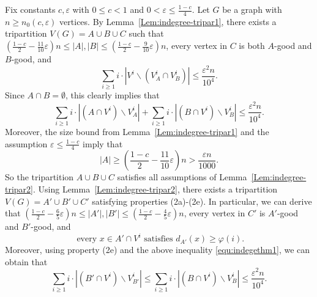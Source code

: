 \documentclass{aic}
\begin{document}
	Fix constants $c, \varepsilon$ with $0\leq c<1$ and $0<\varepsilon\leq \frac{1-c}{4}.$
	Let $G$ be a graph with $n\geq n_0(c,\varepsilon)$ vertices.
	By Lemma~\ref{Lem:indegree-tripar1}, there exists a tripartition $V(G)=A\cup B\cup C$ such that
	$\left(\frac{1-c}{2}-\frac{11}{10}\varepsilon\right)n\leq |A|,|B|\leq \left(\frac{1-c}{2}-\frac{9}{10}\varepsilon\right)n$,
	every vertex in $C$ is both $A$-good and $B$-good, and
	\begin{equation*}
		\sum_{i\ge 1} i\cdot |V^i\backslash (V^i_A\cap V^i_B)|\leq \frac{\varepsilon^2n}{10^4}.
	\end{equation*}
	Since $A\cap B=\emptyset$, this clearly implies that
	\begin{equation}\label{equ:indegethm1}
		\sum_{i\ge 1} i\cdot |(A\cap V^i)\backslash V^i_A|+\sum_{i\ge 1} i\cdot |(B\cap V^i)\backslash V^i_B|\le \frac{\varepsilon^2n}{10^4}.
	\end{equation}
	Moreover, the size bound from Lemma~\ref{Lem:indegree-tripar1} and the assumption $\varepsilon\leq \frac{1-c}{4}$ imply that
	$$|A|\ge \left(\frac{1-c}{2}-\frac{11}{10}\varepsilon\right)n>\frac{\varepsilon n}{1000}.$$
	So the tripartition $A\cup B\cup C$ satisfies all assumptions of Lemma~\ref{Lem:indegree-tripar2}.
	Using Lemma~\ref{Lem:indegree-tripar2}, there exists a tripartition $V(G)=A'\cup B'\cup C'$ satisfying properties (2a)-(2e).
	In particular, we can derive that
	$\left(\frac{1-c}{2}-\frac{6}{5}\varepsilon\right)n\leq |A'|,|B'|\leq \left(\frac{1-c}{2}-\frac{4}{5}\varepsilon\right)n$,
	every vertex in $C'$ is $A'$-good and $B'$-good, and
	\begin{equation}\label{equ:indegethm2}
		\text{ every } x\in A'\cap V^i \text{ satisfies } d_{A'}(x)\ge \varphi(i).
	\end{equation}
	Moreover, using property (2e) and the above inequality \eqref{equ:indegethm1}, we can obtain that
	\begin{equation*}
		\sum_{i\geq 1} i\cdot |(B'\cap V^i)\backslash V^i_{B'}|\leq \sum_{i\geq 1} i\cdot |(B\cap V^i)\backslash V^i_B|\leq \frac{\varepsilon^2n}{10^4}.
	\end{equation*}
	
\end{document}
